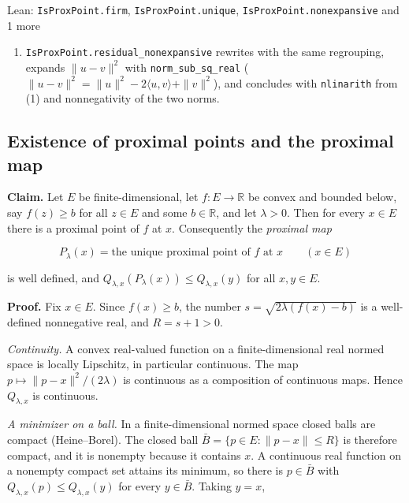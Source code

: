 \documentclass[11pt,a4paper]{report}
\begin{document}
\begin{leanbox}{Lean: \texttt{IsProxPoint.\allowbreak{}firm}, \texttt{IsProxPoint.\allowbreak{}unique}, \texttt{IsProxPoint.\allowbreak{}nonexpansive} and 1 more}
\begin{enumerate}
\item \texttt{Is\allowbreak{}Prox\allowbreak{}Point.\allowbreak{}residual\_\allowbreak{}nonexpansive} rewrites with the same regrouping, expands \(\|u-v\|^2\) with \texttt{norm\_\allowbreak{}sub\_\allowbreak{}sq\_\allowbreak{}real} (\(\|u-v\|^2=\|u\|^2-2\langle u,v\rangle+\|v\|^2\)), and concludes with \texttt{nlinarith} from (1) and nonnegativity of the two norms.

\end{enumerate}
\end{leanbox}
\subsection{\texorpdfstring{Existence of proximal points and the proximal map}{Existence of proximal points and the proximal map}}
\label{report-step-ProximalLangevin-Proximal-lean-4}


\textbf{Claim.} Let \(E\) be finite-dimensional, let \(f:E\to\mathbb R\) be convex and bounded below, say \(f(z)\ge b\) for all \(z\in E\) and some \(b\in\mathbb R\), and let \(\lambda>0\). Then for every \(x\in E\) there is a proximal point of \(f\) at \(x\). Consequently the \emph{proximal map}


\[P_\lambda(x)=\text{the unique proximal point of }f\text{ at }x\qquad(x\in E)\]


is well defined, and \(Q_{\lambda,x}(P_\lambda(x))\le Q_{\lambda,x}(y)\) for all \(x,y\in E\).




\textbf{Proof.} Fix \(x\in E\). Since \(f(x)\ge b\), the number \(s=\sqrt{2\lambda(f(x)-b)}\) is a well-defined nonnegative real, and \(R=s+1>0\).




\emph{Continuity.} A convex real-valued function on a finite-dimensional real normed space is locally Lipschitz, in particular continuous. The map \(p\mapsto\|p-x\|^2/(2\lambda)\) is continuous as a composition of continuous maps. Hence \(Q_{\lambda,x}\) is continuous.




\emph{A minimizer on a ball.} In a finite-dimensional normed space closed balls are compact (Heine–Borel). The closed ball \(\bar B=\{p\in E:\|p-x\|\le R\}\) is therefore compact, and it is nonempty because it contains \(x\). A continuous real function on a nonempty compact set attains its minimum, so there is \(p\in\bar B\) with \(Q_{\lambda,x}(p)\le Q_{\lambda,x}(y)\) for every \(y\in\bar B\). Taking \(y=x\),
\end{document}
